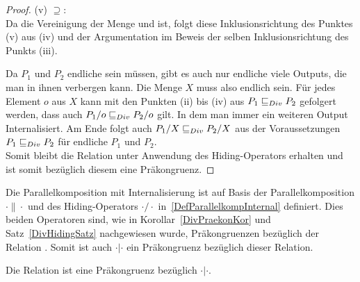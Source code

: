 \begin{proof}
  (v) \glqq $\supseteq$\grqq{}:\\
  Da \QDT{} die Vereinigung der Menge \StQT{} und \EDT{} ist, folgt diese
  Inklusionsrichtung des Punktes (v) aus (iv) und der Argumentation im Beweis
  der selben Inklusionsrichtung des Punkts (iii).

  Da $P_1$ und $P_2$ endliche sein müssen, gibt es auch nur endliche viele
  Outputs, die man in ihnen verbergen kann. Die Menge $X$ muss also endlich
  sein. Für jedes Element $o$ aus $X$ kann mit den Punkten (ii) bis (iv) aus
  $P_1 \sqsubseteq  _{Div} P_2$ gefolgert werden, dass auch $P_1/o \sqsubseteq  _{Div} P_2/o$ gilt. In dem
  man immer ein weiteren Output Internalisiert. Am Ende folgt auch $P_1/X \sqsubseteq  _{Div}
  P_2/X$ aus der Voraussetzungen $P_1 \sqsubseteq  _{Div} P_2$ für endliche \MEIO{} $P_1$ und
  $P_2$.\\
  Somit bleibt die Relation \DRel{} unter Anwendung des Hiding-Operators
  erhalten und ist somit bezüglich diesem eine Präkongruenz.
\end{proof}

Die Parallelkomposition mit Internalisierung ist auf Basis der
Parallelkomposition $\cdot \|\cdot$ und des Hiding-Operators $\cdot /\cdot$
in~\ref{DefParallelkompInternal} definiert. Dies beiden Operatoren sind, wie in
Korollar~\ref{DivPraekonKor} und Satz~\ref{DivHidingSatz} nachgewiesen wurde,
Präkongruenzen bezüglich der Relation \DRel{}. Somit ist auch $\cdot |\cdot$
ein Präkongruenz bezüglich dieser Relation.

\begin{Kor}
  Die Relation \DRel{} ist eine Präkongruenz bezüglich $\cdot |\cdot$.
\end{Kor}
